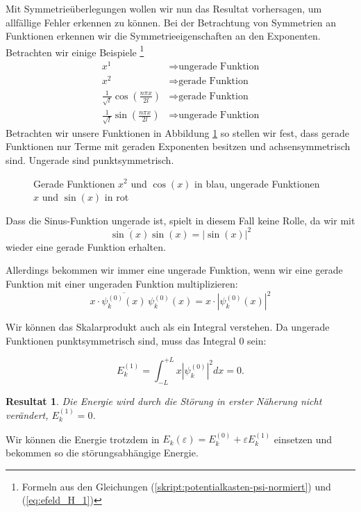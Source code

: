 \begin{refsection}
Mit Symmetrie\"uberlegungen wollen wir nun das Resultat vorhersagen, um allf\"allige Fehler erkennen zu k\"onnen.
Bei der Betrachtung von Symmetrien an Funktionen erkennen wir die Symmetrieeigenschaften an den Exponenten.
Betrachten wir einige Beispiele 
\footnote{Formeln aus den Gleichungen (\ref{skript:potentialkasten-psi-normiert}) und (\ref{eq:efeld_H_1})}
\begin{equation}
\begin{aligned}
x^1 &\Rightarrow \text{ungerade Funktion}
\\
x^2 &\Rightarrow \text{gerade Funktion}
\\
\frac{1}{\sqrt{l}}\cos\left( \frac{n \pi x}{2l} \right)  &\Rightarrow \text{gerade Funktion}
\\
\frac{1}{\sqrt{l}}\sin\left( \frac{n \pi x}{2l} \right)  &\Rightarrow \text{ungerade Funktion}
\end{aligned}
\end{equation}
Betrachten wir unsere Funktionen in Abbildung \ref{abb:efeld_gerade_ungerade} so stellen wir fest, 
dass gerade Funktionen nur Terme mit geraden Exponenten besitzen und achsensymmetrisch sind.
Ungerade sind punktsymmetrisch.

\begin{figure}
  \centering
{}
 \caption{Gerade Funktionen $x^2$ und $\cos(x)$ in blau, ungerade Funktionen $x$ und $\sin(x)$ in rot}
 \label{abb:efeld_gerade_ungerade}
\end{figure}

Dass die Sinus-Funktion ungerade ist, spielt in diesem Fall keine Rolle, da wir mit 
\[
  \overline{\sin(x)} \sin(x) = |\sin(x)|^2
\]
wieder eine gerade Funktion erhalten.

Allerdings bekommen wir immer eine ungerade Funktion, wenn wir eine gerade Funktion mit einer ungeraden Funktion multiplizieren:
\[ 
  x \cdot \overline{\psi_k^{(0)}(x)} \, \psi_k^{(0)}(x) = x \cdot |\psi_k^{(0)}(x)|^2
\]

Wir k\"onnen das Skalarprodukt auch als ein Integral verstehen.
Da ungerade Funktionen punktsymmetrisch sind, muss das Integral $0$ sein:
\newtheorem{result}{Resultat}[chapter]
\[
  E_k^{(1)} = \int_{-L}^{+L} x |\psi_k^{(0)}|^2 dx = 0 .
\]
\begin{result}
Die Energie wird durch die St\"orung in erster N\"aherung
nicht ver\"andert, $E_k^{(1)} = 0$.
\end{result}
Wir k\"onnen die Energie trotzdem in
$E_k(\varepsilon)=E_k^{(0)} + \varepsilon E_k^{(1)}$ einsetzen
und bekommen so die st\"orungsabh\"angige Energie.





\end{refsection}
